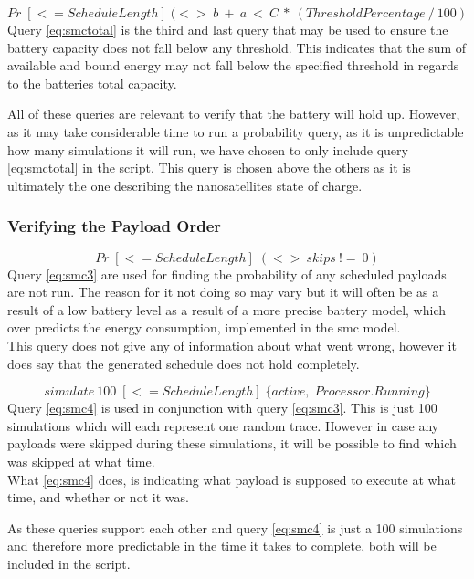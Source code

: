 \begin{equation} \label{eq:smctotal}
	Pr\; [<=ScheduleLength] \; (<>\; b\ +\ a\ <\ C\ *\ (ThresholdPercentage\ /\ 100)
\end{equation}
Query \ref{eq:smctotal} is the third and last query that may be used to ensure the battery capacity does not fall below any threshold. This indicates that the sum of available and bound energy may not fall below the specified threshold in regards to the batteries total capacity.

All of these queries are relevant to verify that the battery will hold up. However, as it may take considerable time to run a probability query, as it is unpredictable how many simulations it will run, we have chosen to only include query \ref{eq:smctotal} in the script. This query is chosen above the others as it is ultimately the one describing the nanosatellites state of charge.

\subsubsection*{Verifying the Payload Order}
\begin{equation} \label{eq:smc3}
	Pr\; [<=ScheduleLength] \; (<> \ skips \ !=\ 0)
\end{equation}
Query \ref{eq:smc3} are used for finding the probability of any scheduled payloads are not run. The reason for it not doing so may vary but it will often be as a result of a low battery level as a result of a more precise battery model, which over predicts the energy consumption, implemented in the \gls{smc} model.\\
This query does not give any of information about what went wrong, however it does say that the generated schedule does not hold completely.

\begin{equation} \label{eq:smc4}
	simulate\ 100 \; [<=ScheduleLength] \; \{active, \; Processor.Running\}
\end{equation}
Query \ref{eq:smc4} is used in conjunction with query \ref{eq:smc3}. This is just 100 simulations which will each represent one random trace. However in case any payloads were skipped during these simulations, it will be possible to find which was skipped at what time.\\
What \ref{eq:smc4} does, is indicating what payload is supposed to execute at what time, and whether or not it was.

As these queries support each other and query \ref{eq:smc4} is just a 100 simulations and therefore more predictable in the time it takes to complete, both will be included in the script.

